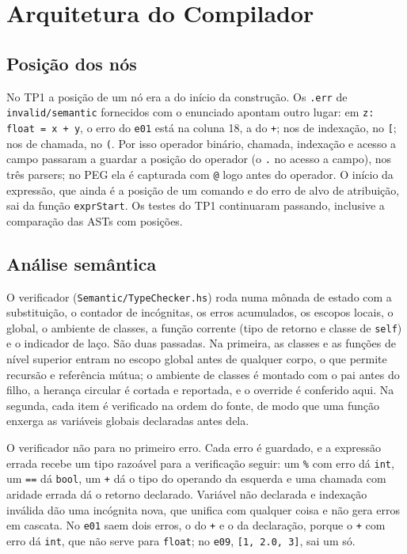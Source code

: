 \documentclass[12pt,a4paper]{article}
\begin{document}
\section{Arquitetura do Compilador}

\subsection{Posição dos nós}

No TP1 a posição de um nó era a do início da construção. Os
\texttt{.err} de \texttt{invalid/semantic} fornecidos com o enunciado
apontam outro lugar: em \texttt{z: float = x + y}, o erro do
\texttt{e01} está na coluna 18, a do \texttt{+}; nos de indexação, no
\texttt{[}; nos de chamada, no \texttt{(}. Por isso operador binário,
chamada, indexação e acesso a campo passaram a guardar a posição do
operador (o \texttt{.} no acesso a campo), nos três parsers; no PEG ela
é capturada com \texttt{@} logo antes do operador. O início da
expressão, que ainda é a posição de um comando e do erro de alvo de
atribuição, sai da função \texttt{exprStart}. Os testes do TP1
continuaram passando, inclusive a comparação das ASTs com posições.

\subsection{Análise semântica}

O verificador (\texttt{Semantic/TypeChecker.hs}) roda numa mônada de
estado com a substituição, o contador de incógnitas, os erros
acumulados, os escopos locais, o global, o ambiente de classes, a
função corrente (tipo de retorno e classe de \texttt{self}) e o
indicador de laço. São duas passadas. Na primeira, as classes e as
funções de nível superior entram no escopo global antes de qualquer
corpo, o que permite recursão e referência mútua; o ambiente de classes
é montado com o pai antes do filho, a herança circular é cortada e
reportada, e o override é conferido aqui. Na segunda, cada item é
verificado na ordem do fonte, de modo que uma função enxerga as
variáveis globais declaradas antes dela.

O verificador não para no primeiro erro. Cada erro é guardado, e a
expressão errada recebe um tipo razoável para a verificação seguir:
um \texttt{\%} com erro dá \texttt{int}, um \texttt{==} dá
\texttt{bool}, um \texttt{+} dá o tipo do operando da esquerda e uma
chamada com aridade errada dá o retorno declarado. Variável não
declarada e indexação inválida dão uma incógnita nova, que unifica com
qualquer coisa e não gera erros em cascata. No \texttt{e01} saem dois
erros, o do \texttt{+} e o da declaração, porque o \texttt{+} com erro
dá \texttt{int}, que não serve para \texttt{float}; no \texttt{e09},
\texttt{[1, 2.0, 3]}, sai um só.
\end{document}
